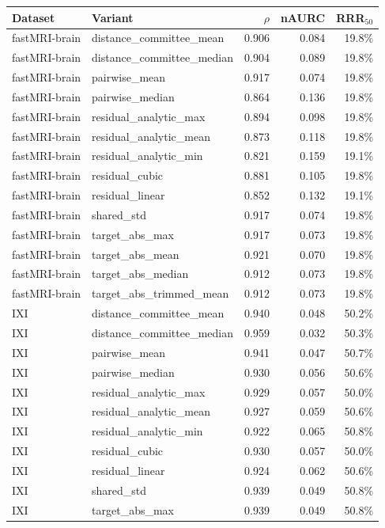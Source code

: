 \begin{tabular}{llrrr}
\toprule
Dataset & Variant & $\rho$ & nAURC & RRR$_{50}$ \\
\midrule
fastMRI-brain & distance\_committee\_mean & 0.906 & 0.084 & 19.8\% \\
fastMRI-brain & distance\_committee\_median & 0.904 & 0.089 & 19.8\% \\
fastMRI-brain & pairwise\_mean & 0.917 & 0.074 & 19.8\% \\
fastMRI-brain & pairwise\_median & 0.864 & 0.136 & 19.8\% \\
fastMRI-brain & residual\_analytic\_max & 0.894 & 0.098 & 19.8\% \\
fastMRI-brain & residual\_analytic\_mean & 0.873 & 0.118 & 19.8\% \\
fastMRI-brain & residual\_analytic\_min & 0.821 & 0.159 & 19.1\% \\
fastMRI-brain & residual\_cubic & 0.881 & 0.105 & 19.8\% \\
fastMRI-brain & residual\_linear & 0.852 & 0.132 & 19.1\% \\
fastMRI-brain & shared\_std & 0.917 & 0.074 & 19.8\% \\
fastMRI-brain & target\_abs\_max & 0.917 & 0.073 & 19.8\% \\
fastMRI-brain & target\_abs\_mean & 0.921 & 0.070 & 19.8\% \\
fastMRI-brain & target\_abs\_median & 0.912 & 0.073 & 19.8\% \\
fastMRI-brain & target\_abs\_trimmed\_mean & 0.912 & 0.073 & 19.8\% \\
IXI & distance\_committee\_mean & 0.940 & 0.048 & 50.2\% \\
IXI & distance\_committee\_median & 0.959 & 0.032 & 50.3\% \\
IXI & pairwise\_mean & 0.941 & 0.047 & 50.7\% \\
IXI & pairwise\_median & 0.930 & 0.056 & 50.6\% \\
IXI & residual\_analytic\_max & 0.929 & 0.057 & 50.0\% \\
IXI & residual\_analytic\_mean & 0.927 & 0.059 & 50.6\% \\
IXI & residual\_analytic\_min & 0.922 & 0.065 & 50.8\% \\
IXI & residual\_cubic & 0.930 & 0.057 & 50.0\% \\
IXI & residual\_linear & 0.924 & 0.062 & 50.6\% \\
IXI & shared\_std & 0.939 & 0.049 & 50.8\% \\
IXI & target\_abs\_max & 0.939 & 0.049 & 50.8\% \\

\end{tabular}

